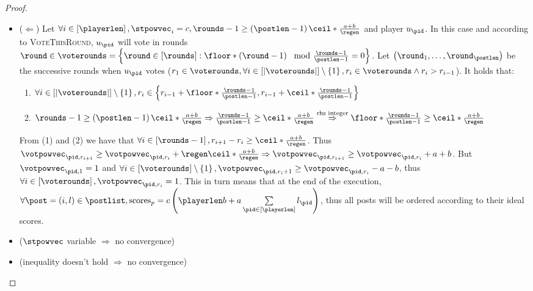\begin{proof}
  \begin{itemize}
    \item ($\Leftarrow$) Let $\forall i \in \left[\playerlen\right], \stpowvec_i
    = c, \rounds - 1 \geq \left(\postlen - 1\right)\ceil*{\frac{a+b}{\regen}}$
    and player $u_{\pid}$. In this case and according to \textsc{VoteThisRound},
    $u_{\pid}$ will vote in rounds $\round \in \voterounds = \left\{\round \in
    \left[\rounds\right] : \floor*{\left(\round - 1\right) \mod \frac{\rounds -
    1}{\postlen - 1}} = 0\right\}$. Let $\left(\round_1, \dots,
    \round_\postlen\right)$ be the successive rounds when $u_{\pid}$ votes ($r_1
    \in \voterounds, \forall i \in \left[|\voterounds|\right] \setminus
    \left\{1\right\}, r_i \in \voterounds \wedge r_i > r_{i - 1}$). It holds
    that:
    \begin{enumerate}
      \item $\forall i \in \left[|\voterounds|\right] \setminus
      \left\{1\right\}, r_i \in \left\{r_{i - 1} + \floor*{\frac{\rounds -
      1}{\postlen - 1}}, r_{i - 1} + \ceil*{\frac{\rounds - 1}{\postlen -
      1}}\right\}$
      \item $\rounds - 1 \geq \left(\postlen -
      1\right)\ceil*{\frac{a+b}{\regen}} \Rightarrow \frac{\rounds - 1}{\postlen
      - 1} \geq \ceil*{\frac{a+b}{\regen}} \overset{\text{rhs
      integer}}{\Rightarrow} \floor*{\frac{\rounds - 1}{\postlen - 1}} \geq
      \ceil*{\frac{a+b}{\regen}}$
    \end{enumerate}
    From (1) and (2) we have that $\forall i \in \left[\rounds - 1\right],
    r_{i+1} - r_i \geq \ceil*{\frac{a+b}{\regen}}$. Thus $\votpowvec_{\pid, r_{i
    + 1}} \geq \votpowvec_{\pid, r_i} + \regen\ceil*{\frac{a+b}{\regen}}
    \Rightarrow \votpowvec_{\pid, r_{i + 1}} \geq \votpowvec_{\pid, r_i} + a +
    b$. But $\votpowvec_{\pid, 1} = 1$ and $\forall i \in
    \left[\voterounds\right] \setminus \left\{1\right\}, \votpowvec_{\pid, r_i
    + 1} \geq \votpowvec_{\pid, r_i} - a - b$, thus $\forall i \in
    \left[\voterounds\right], \votpowvec_{\pid, r_i} = 1$. This in turn means
    that at the end of the execution, $\forall \post = \left(i, l\right) \in \postlist,
    \mathrm{scores}_{p} = c\left(\playerlen b + a \sum\limits_{\pid \in
    \left[\playerlen\right]} l_{\pid}\right)$, thus all posts will be ordered
    according to their ideal scores.
    \item ($\stpowvec$ variable $\Rightarrow$ no convergence)
    \item (inequality doesn't hold $\Rightarrow$ no convergence)
  \end{itemize}
\end{proof}
